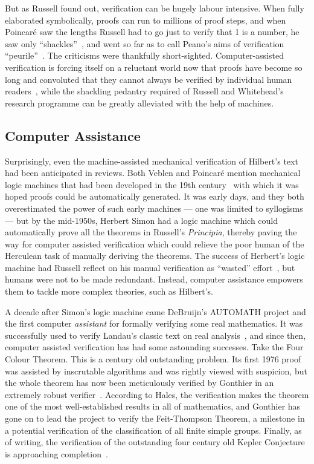 But as Russell found out, verification can be hugely labour intensive. When fully elaborated symbolically, proofs can run to millions of proof steps, and when Poincar\'{e} saw the lengths Russell had to go just to verify that 1 is a number, he saw only ``shackles''~\cite{PoincareShackles}, and went so far as to call Peano's aims of verification ``peurile''~\cite{PoincareReview}. The criticisms were thankfully short-sighted. Computer-assisted verification is forcing itself on a reluctant world now that proofs have become so long and convoluted that they cannot always be verified by individual human readers~\cite{WhitherMathematics}, while the shackling pedantry required of Russell and Whitehead's research programme can be greatly alleviated with the help of machines.

\subsection{Computer Assistance}
Surprisingly, even the machine-assisted mechanical verification of Hilbert's text had been anticipated in reviews. Both Veblen and Poincar\'{e} mention mechanical logic machines that had been developed in the 19th century~\cite{LogicMachines} with which it was hoped proofs could be automatically generated. It was early days, and they both overestimated the power of such early machines --- one was limited to syllogisms --- but by the mid-1950s, Herbert Simon had a logic machine which could automatically prove all the theorems in Russell's \emph{Principia}, thereby paving the way for computer assisted verification which could relieve the poor human of the Herculean task of manually deriving the theorems. The success of Herbert's logic machine had Russell reflect on his manual verification as ``wasted'' effort~\cite{SimonObituary}, but humans were not to be made redundant. Instead, computer assistance empowers them to tackle more complex theories, such as Hilbert's.

A decade after Simon's logic machine came DeBruijn's AUTOMATH project and the first computer \emph{assistant} for formally verifying some real mathematics. It was successfully used to verify Landau's classic text on real analysis~\cite{LandauGrundlagen,LandauAUTOMATH}, and since then, computer assisted verification has had some astounding successes. Take the Four Colour Theorem. This is a century old outstanding problem. Its first 1976 proof was assisted by inscrutable algorithms and was rightly viewed with suspicion, but the whole theorem has now been meticulously verified by Gonthier in an extremely robust verifier~\cite{GonthierFCT}. According to Hales, the verification makes the theorem one of the most well-established results in all of mathematics, and Gonthier has gone on to lead the project to verify the Feit-Thompson Theorem, a milestone in a potential verification of the classification of all finite simple groups. Finally, as of writing, the verification of the outstanding four century old Kepler Conjecture is approaching completion~\cite{flyspeck}. 

